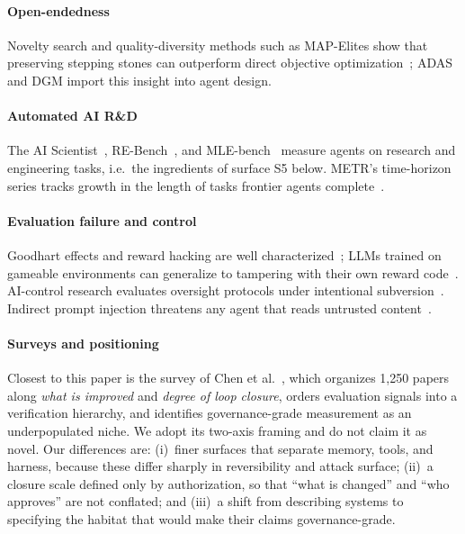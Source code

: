 \documentclass[11pt,a4paper]{article}
\begin{document}
\paragraph{Open-endedness} Novelty search and quality-diversity methods such as MAP-Elites show that preserving stepping stones can outperform direct objective optimization~\cite{novelty,mapelites}; ADAS and DGM import this insight into agent design.

\paragraph{Automated AI R\&D} The AI Scientist~\cite{aiscientist}, RE-Bench~\cite{rebench}, and MLE-bench~\cite{mlebench} measure agents on research and engineering tasks, i.e.\ the ingredients of surface S5 below. METR's time-horizon series tracks growth in the length of tasks frontier agents complete~\cite{metr-horizon}.

\paragraph{Evaluation failure and control} Goodhart effects and reward hacking are well characterized~\cite{goodhart,rewardhacking}; LLMs trained on gameable environments can generalize to tampering with their own reward code~\cite{subterfuge}. AI-control research evaluates oversight protocols under intentional subversion~\cite{aicontrol,kutasov,untrusted-monitoring}. Indirect prompt injection threatens any agent that reads untrusted content~\cite{greshake,wasp,stepjack}.

\paragraph{Surveys and positioning} Closest to this paper is the survey of Chen et al.~\cite{chen-survey}, which organizes 1,250 papers along \emph{what is improved} and \emph{degree of loop closure}, orders evaluation signals into a verification hierarchy, and identifies governance-grade measurement as an underpopulated niche. We adopt its two-axis framing and do not claim it as novel. Our differences are: (i)~finer surfaces that separate memory, tools, and harness, because these differ sharply in reversibility and attack surface; (ii)~a closure scale defined only by authorization, so that ``what is changed'' and ``who approves'' are not conflated; and (iii)~a shift from describing systems to specifying the habitat that would make their claims governance-grade.
\end{document}
